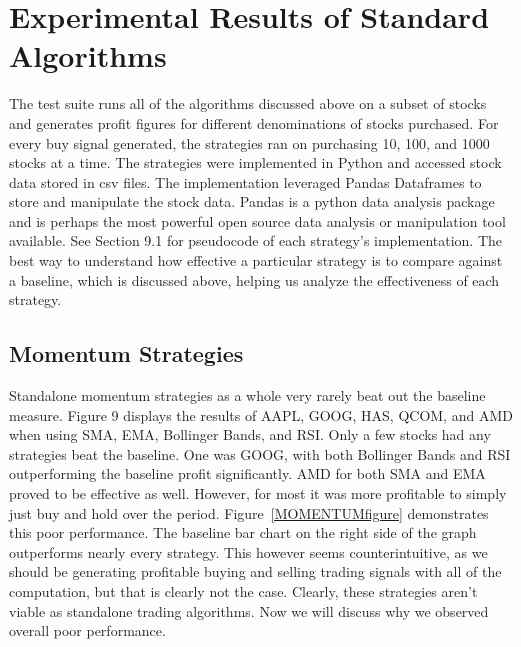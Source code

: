 \documentclass[../thesis.tex]{subfiles}
\begin{document}
\chapter{Experimental Results of Standard Algorithms}
\label{ch:experimentsalgos}

The test suite runs all of the algorithms discussed above on a subset of stocks and generates profit figures for different denominations of stocks purchased. For every buy signal generated, the strategies ran on purchasing 10, 100, and 1000 stocks at a time. The strategies were implemented in Python and accessed stock data stored in csv files. The implementation leveraged Pandas Dataframes to store and manipulate the stock data. Pandas is a python data analysis package and is perhaps the most powerful open source data analysis or manipulation tool available. See Section 9.1 for pseudocode of each strategy's implementation.  The best way to understand how effective a particular strategy is to compare against a baseline, which is discussed above, helping us analyze the effectiveness of each strategy.   

\section{Momentum Strategies}

Standalone momentum strategies as a whole very rarely beat out the baseline measure. Figure 9 displays the results of AAPL, GOOG, HAS, QCOM, and AMD when using SMA, EMA, Bollinger Bands, and RSI. Only a few stocks had any strategies beat the baseline. One was GOOG, with both Bollinger Bands and RSI outperforming the baseline profit significantly. AMD for both SMA and EMA proved to be effective as well. However, for most it was more profitable to simply just buy and hold over the period. Figure~\ref{MOMENTUMfigure} demonstrates this poor performance. The baseline bar chart on the right side of the graph outperforms nearly every strategy. This however seems counterintuitive, as we should be generating profitable buying and selling trading signals with all of the computation, but that is clearly not the case.  Clearly, these strategies aren't viable as standalone trading algorithms. Now we will discuss why we observed overall poor performance.
\end{document}

